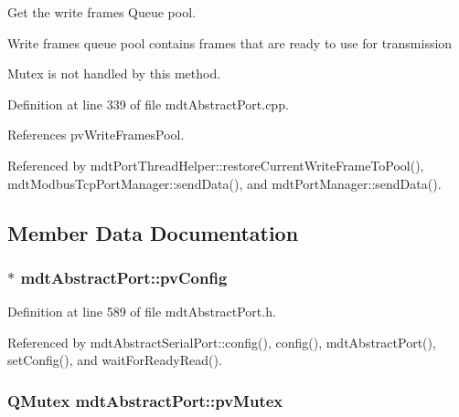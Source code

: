 Get the write frames Queue pool. 

Write frames queue pool contains frames that are ready to use for transmission

Mutex is not handled by this method. 

Definition at line 339 of file mdt\-Abstract\-Port.\-cpp.



References pv\-Write\-Frames\-Pool.



Referenced by mdt\-Port\-Thread\-Helper\-::restore\-Current\-Write\-Frame\-To\-Pool(), mdt\-Modbus\-Tcp\-Port\-Manager\-::send\-Data(), and mdt\-Port\-Manager\-::send\-Data().



\subsection{Member Data Documentation}
\hypertarget{classmdt_abstract_port_a035d72bddbac47f405a8ecf0d2eeba66}{
\subsubsection[{pv\-Config}]{$\ast$ mdt\-Abstract\-Port\-::pv\-Config\hspace{0.3cm}{\ttfamily [protected]}}}\label{classmdt_abstract_port_a035d72bddbac47f405a8ecf0d2eeba66}


Definition at line 589 of file mdt\-Abstract\-Port.\-h.



Referenced by mdt\-Abstract\-Serial\-Port\-::config(), config(), mdt\-Abstract\-Port(), set\-Config(), and wait\-For\-Ready\-Read().

\hypertarget{classmdt_abstract_port_a357bce65bc031fffa87090a26ab88a08}{
\subsubsection[{pv\-Mutex}]{\setlength{\rightskip}{0pt plus 5cm}Q\-Mutex mdt\-Abstract\-Port\-::pv\-Mutex\hspace{0.3cm}{\ttfamily [protected]}}}\label{classmdt_abstract_port_a357bce65bc031fffa87090a26ab88a08}


